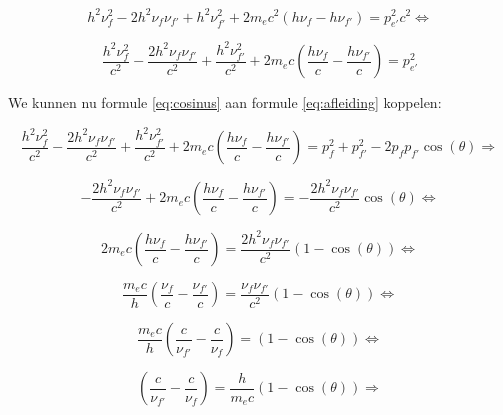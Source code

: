 \begin{equation}
h^{2}\nu_{f}^{2}-2h^{2}\nu_{f}\nu_{f'}+h^{2}\nu_{f'}^{2}+2m_{e}c^{2}\left(h\nu_{f}-h\nu_{f'}\right)=p_{e'}^{2}c^{2}\Longleftrightarrow
\end{equation}


\begin{equation} \label{eq:afleiding}
\frac{h^{2}\nu_{f}^{2}}{c^{2}}-\frac{2h^{2}\nu_{f}\nu_{f'}}{c^{2}}+\frac{h^{2}\nu_{f'}^{2}}{c^{2}}+2m_{e}c\left(\frac{h\nu_{f}}{c}-\frac{h\nu_{f'}}{c}\right)=p_{e'}^{2}
\end{equation}


We kunnen nu formule \ref{eq:cosinus} aan formule \ref{eq:afleiding} koppelen:

\begin{equation}
\frac{h^{2}\nu_{f}^{2}}{c^{2}}-\frac{2h^{2}\nu_{f}\nu_{f'}}{c^{2}}+\frac{h^{2}\nu_{f'}^{2}}{c^{2}}+2m_{e}c\left(\frac{h\nu_{f}}{c}-\frac{h\nu_{f'}}{c}\right)=p_{f}^{2}+p_{f'}^{2}-2p_{f}p_{f'}\cos\left(\theta\right)\Longrightarrow
\end{equation}


\begin{equation}
-\frac{2h^{2}\nu_{f}\nu_{f'}}{c^{2}}+2m_{e}c\left(\frac{h\nu_{f}}{c}-\frac{h\nu_{f'}}{c}\right)=-\frac{2h^{2}\nu_{f}\nu_{f'}}{c^{2}}\cos\left(\theta\right)\Longleftrightarrow
\end{equation}


\begin{equation}
2m_{e}c\left(\frac{h\nu_{f}}{c}-\frac{h\nu_{f'}}{c}\right)=\frac{2h^{2}\nu_{f}\nu_{f'}}{c^{2}}\left(1-\cos\left(\theta\right)\right)\Longleftrightarrow
\end{equation}


\begin{equation}
\frac{m_{e}c}{h}\left(\frac{\nu_{f}}{c}-\frac{\nu_{f'}}{c}\right)=\frac{\nu_{f}\nu_{f'}}{c^{2}}\left(1-\cos\left(\theta\right)\right)\Longleftrightarrow
\end{equation}


\begin{equation}
\frac{m_{e}c}{h}\left(\frac{c}{\nu_{f'}}-\frac{c}{\nu_{f}}\right)=\left(1-\cos\left(\theta\right)\right)\Longleftrightarrow
\end{equation}


\begin{equation}
\left(\frac{c}{\nu_{f'}}-\frac{c}{\nu_{f}}\right)=\frac{h}{m_{e}c}\left(1-\cos\left(\theta\right)\right)\Longrightarrow
\end{equation}


